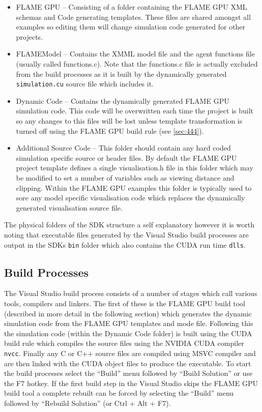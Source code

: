 \documentclass[11pt, a4paper, onecolumn, oneside]{report}
\begin{document}
\begin{itemize}
    \item FLAME GPU -- Consisting of a folder containing the FLAME GPU XML schemas and Code generating templates. These files are shared amongst all examples so editing them will change simulation code generated for other projects.
    \item FLAMEModel -- Contains the XMML model file and the agent functions file (usually called functions.c).
        Note that the functions.c file is actually excluded from the build processes as it is built by the dynamically generated \texttt{simulation.cu} source file which includes it.
    \item Dynamic Code -- Contains the dynamically generated FLAME GPU simulation code.
        This code will be overwritten each time the project is built so any changes to this files will be lost unless template transformation is turned off using the FLAME GPU build rule (see \cref{sec:444}).
    \item Additional Source Code -- This folder should contain any hard coded simulation specific source or header files.
        By default the FLAME GPU project template defines a single visualisation.h file in this folder which may be modified to set a number of variables such as viewing distance and clipping.
        Within the FLAME GPU examples this folder is typically used to sore any model specific visualisation code which replaces the dynamically generated visualisation source file.
\end{itemize}

The physical folders of the SDK structure a self explanatory however it is worth noting that executable files generated by the Visual Studio build processes are output in the SDKs \texttt{bin} folder which also contains the CUDA run time \texttt{dlls}. 


\subsection{Build Processes}
\label{sec:443}

The Visual Studio build process consists of a number of stages which call various tools, compilers and linkers.
The first of these is the FLAME GPU build tool (described in more detail in the following section) which generates the dynamic simulation code from the FLAME GPU templates and mode file.
Following this the simulation code (within the Dynamic Code folder) is built using the CUDA build rule which compiles the source files using the NVIDIA CUDA compiler \texttt{nvcc}.
Finally any C or C++ source files are compiled using MSVC compiler and are then linked with the CUDA object files to produce the executable.
To start the build processes select the ``Build'' menu followed by ``Build Solution'' or use the F7 hotkey.
If the first build step in the Visual Studio skips the FLAME GPU build tool a complete rebuilt can be forced by selecting the ``Build'' menu followed by ``Rebuild Solution'' (or Ctrl + Alt + F7).
\end{document}
